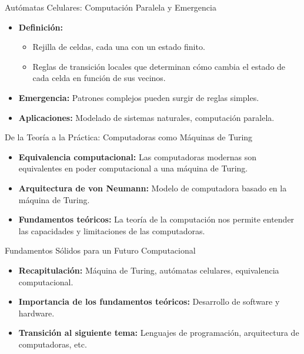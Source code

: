 \documentclass{beamer}
\begin{document}
	\begin{frame}{Autómatas Celulares: Computación Paralela y Emergencia}
		
		\begin{itemize}
			\item \textbf{Definición:} 
			\begin{itemize}
				\item Rejilla de celdas, cada una con un estado finito.
				\item Reglas de transición locales que determinan cómo cambia el estado de cada celda en función de sus vecinos.
			\end{itemize}
			\item \textbf{Emergencia:} Patrones complejos pueden surgir de reglas simples.
			\item \textbf{Aplicaciones:} Modelado de sistemas naturales, computación paralela.
		\end{itemize}
		
	\end{frame}
	
	\begin{frame}{De la Teoría a la Práctica: Computadoras como Máquinas de Turing}
		
		\begin{itemize}
			\item \textbf{Equivalencia computacional:} Las computadoras modernas son equivalentes en poder computacional a una máquina de Turing.
			\item \textbf{Arquitectura de von Neumann:} Modelo de computadora basado en la máquina de Turing.
			\item \textbf{Fundamentos teóricos:} La teoría de la computación nos permite entender las capacidades y limitaciones de las computadoras.
		\end{itemize}
		
	\end{frame}
	
	\begin{frame}{Fundamentos Sólidos para un Futuro Computacional}
		
		\begin{itemize}
			\item \textbf{Recapitulación:} Máquina de Turing, autómatas celulares, equivalencia computacional.
			\item \textbf{Importancia de los fundamentos teóricos:} Desarrollo de software y hardware.
			\item \textbf{Transición al siguiente tema:} Lenguajes de programación, arquitectura de computadoras, etc.
		\end{itemize}
		
	\end{frame}
	
\end{document}
